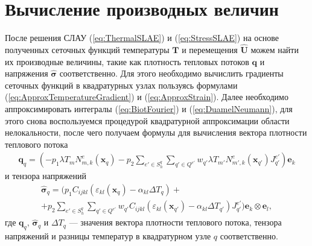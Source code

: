 \section{Вычисление производных величин}\label{sec:NumericalMethods/FluxStressCalculating}

После решения СЛАУ (\ref{eq:ThermalSLAE}) и (\ref{eq:StressSLAE}) на основе полученных сеточных функций температуры $\textbf{T}$ и перемещения $\widehat{\textbf{U}}$ можем найти их производные величины, такие как плотность тепловых потоков $\boldsymbol{q}$ и напряжения $\widehat{\boldsymbol{\sigma}}$ соответственно. Для этого необходимо вычислить градиенты сеточных функций в квадратурных узлах пользуясь формулами (\ref{eq:ApproxTemperatureGradient}) и (\ref{eq:ApproxStrain}). Далее необходимо аппроксимировать интегралы (\ref{eq:BiotFourier}) и (\ref{eq:DuamelNeumann}), для этого снова воспользуемся процедурой квадратурной аппроксимации области нелокальности, после чего получаем формулы для вычисления вектора плотности теплового потока
\begin{gather}
	\label{eq:ApproxFlux}
	\boldsymbol{q}_q = 
	\left(	
	-p_1 \lambda T_m N^e_{m,k} (\boldsymbol{x}_q)
	-p_2 \sum\limits_{e' \in S_h^q} \sum\limits_{q' \in Q^{e'}} w_{q'} \lambda T_{m'} N^e_{m',k} (\boldsymbol{x}_{q'}) J^{e'}_{q'}
	\right) \boldsymbol{e}_k
\end{gather}
и тензора напряжений
\begin{multline}
	\label{eq:ApproxStress}
	\widehat{\boldsymbol{\sigma}}_q =
	\Biggr(
	p_1 C_{ijkl} \left(\varepsilon_{kl} (\boldsymbol{x}_q) - \alpha_{kl} \Delta T_q \right)
	+\\+
	p_2 \sum\limits_{e' \in S_h^q} \sum\limits_{q' \in Q^{e'}} w_{q'} C_{ijkl} \left(\varepsilon_{kl} (\boldsymbol{x}_{q'}) - \alpha_{kl} \Delta T_{q'} \right) J^{e'}_{q'}
	\Biggr) \boldsymbol{e}_k \otimes \boldsymbol{e}_l,
\end{multline}
где $\boldsymbol{q}_q$, $\widehat{\boldsymbol{\sigma}}_q$ и $\Delta T_q$ --- значения вектора плотности теплового потока, тензора напряжений и разницы температур в квадратурном узле $q$ соответственно.

